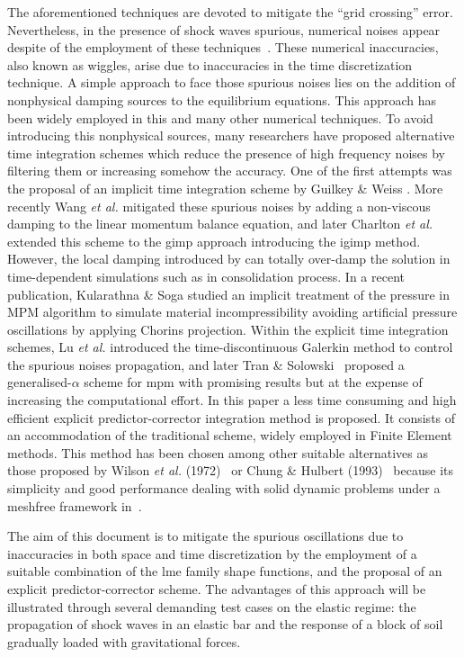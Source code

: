 \documentclass[preprint,12pt,a4paper]{elsarticle}
\begin{document}
The aforementioned techniques are devoted to mitigate the
``grid crossing'' error. Nevertheless, in the presence of shock waves spurious,
numerical noises appear despite of the employment of these
techniques~\cite{Tran2019e}. These numerical inaccuracies, also known
as wiggles, arise due to inaccuracies in the time discretization technique.
A simple approach to face those spurious noises lies on the addition of nonphysical damping sources to the equilibrium equations. This
approach has been widely employed in this and many other numerical
techniques. To avoid introducing this nonphysical sources, many
researchers have proposed alternative time integration
schemes which reduce the presence of high frequency noises by
filtering them or increasing somehow the accuracy. One of the first attempts was
the proposal of an implicit time integration scheme by Guilkey \&
Weiss \cite{Guilkey_2003}. More recently Wang {\it et al.}
\cite{Wang_2016} mitigated these spurious noises by adding a non-viscous
damping to the linear momentum balance equation, and later Charlton
{\it et al.} \cite{Charlton_2017} extended this scheme to the
\acrshort{gimp} approach introducing the \acrfull{igimp}
method. However, the local damping introduced by 
\cite{Wang_2016} can totally over-damp the solution in time-dependent
simulations such as in consolidation process. In a recent publication,
Kularathna \& Soga \cite{Soga_2017} studied an implicit treatment of the pressure in MPM algorithm to simulate material incompressibility
avoiding artificial pressure oscillations by applying
Chorin\textquotesingle s
projection. Within the explicit time integration schemes, Lu {\it et al.}\cite{LU_2018} introduced the time-discontinuous Galerkin method to control the spurious noises
propagation, and later Tran \& Solowski~\cite{Tran2019e}
proposed a generalised-$\alpha$ scheme for \acrshort{mpm} with
promising results but at the expense of increasing the computational
effort. In this paper a less time consuming and high efficient explicit predictor-corrector integration method is
proposed. It consists of an accommodation of the traditional  scheme, widely employed in Finite Element methods. This method
has been chosen among other suitable alternatives as those proposed
by Wilson {\it et al.} (1972)~\cite{Wilson1972} or Chung \& Hulbert
(1993)~\cite{Geranlized_alpha_1993} because its simplicity and good
performance dealing with solid dynamic problems under a meshfree
framework in~\cite{Navas2018a}.

The aim of this document is to mitigate the spurious oscillations due to
inaccuracies in both space and time discretization by the employment of a
suitable combination of the \acrshort{lme} family shape functions, and the proposal of an explicit predictor-corrector scheme. The advantages of
this approach will be illustrated through several demanding test cases on the elastic regime: the
propagation of shock waves in an elastic bar and the response of a block of soil gradually loaded with gravitational forces.
\end{document}
